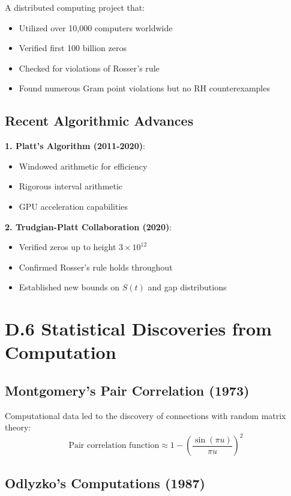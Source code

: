 A distributed computing project that:
\begin{itemize}
\item Utilized over 10,000 computers worldwide
\item Verified first 100 billion zeros
\item Checked for violations of Rosser's rule
\item Found numerous Gram point violations but no RH counterexamples
\end{itemize}

\subsection{Recent Algorithmic Advances}

\textbf{1. Platt's Algorithm (2011-2020)}:
\begin{itemize}
\item Windowed arithmetic for efficiency
\item Rigorous interval arithmetic
\item GPU acceleration capabilities
\end{itemize}

\textbf{2. Trudgian-Platt Collaboration (2020)}:
\begin{itemize}
\item Verified zeros up to height $3 \times 10^{12}$
\item Confirmed Rosser's rule holds throughout
\item Established new bounds on $S(t)$ and gap distributions
\end{itemize}

\section{D.6 Statistical Discoveries from Computation}

\subsection{Montgomery's Pair Correlation (1973)}

Computational data led to the discovery of connections with random matrix theory:
\begin{equation}
\text{Pair correlation function} \approx 1 - \left(\frac{\sin(\pi u)}{\pi u}\right)^2
\end{equation}

\subsection{Odlyzko's Computations (1987)}

